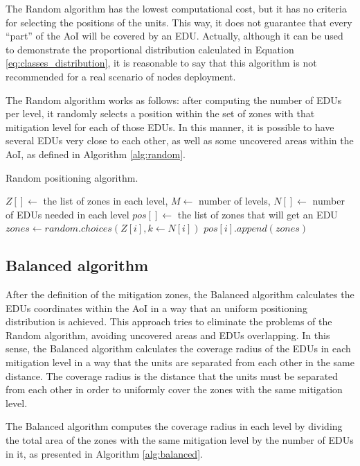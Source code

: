 \begin{refsection}
The Random algorithm has the lowest computational cost, but it has no criteria for selecting the positions of the units. This way, it does not guarantee that every ``part'' of the AoI will be covered by an EDU. Actually, although it can be used to demonstrate the proportional distribution calculated in Equation \ref{eq:classes_distribution}, it is reasonable to say that this algorithm is not recommended for a real scenario of nodes deployment. 

The Random algorithm works as follows: after computing the number of EDUs per level, it randomly selects a position within the set of zones with that mitigation level for each of those EDUs. In this manner, it is possible to have several EDUs very close to each other, as well as some uncovered areas within the AoI, as defined in Algorithm \ref{alg:random}.

\begin{algorithm}[ht]
  \caption{Random positioning algorithm.}\label{alg:random}
  \begin{algorithmic}
    \REQUIRE $Z[] \gets$ the list of zones in each level, $M \gets$ number of levels, $N[] \gets$ number of EDUs needed in each level
    \ENSURE $pos[] \gets$ the list of zones that will get an EDU
      \STATE $zones \gets random.choices(Z[i], k \gets N[i])$
      \STATE $pos[i].append(zones)$
    \ENDFOR
  \end{algorithmic}
\end{algorithm}


\subsection {Balanced algorithm}

After the definition of the mitigation zones, the Balanced algorithm calculates the EDUs coordinates within the AoI in a way that an uniform positioning distribution is achieved. This approach tries to eliminate the problems of the Random algorithm, avoiding uncovered areas and EDUs overlapping. In this sense, the Balanced algorithm calculates the coverage radius of the EDUs in each mitigation level in a way that the units are separated from each other in the same distance. The coverage radius is the distance that the units must be separated from each other in order to uniformly cover the zones with the same mitigation level. 

The Balanced algorithm computes the coverage radius in each level by dividing the total area of the zones with the same mitigation level by the number of EDUs in it, as presented in Algorithm \ref{alg:balanced}. 


\end{refsection}
